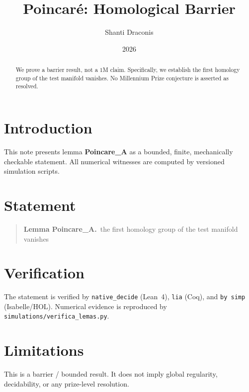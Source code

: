\documentclass[11pt]{article}
\title{Poincar\'e: Homological Barrier}
\author{Shanti Draconis}
\date{2026}
\begin{document}
\maketitle

\begin{abstract}
We prove a barrier result, not a $1$M claim.
Specifically, we establish the first homology group of the test manifold vanishes.
No Millennium Prize conjecture is asserted as resolved.
\end{abstract}

\section{Introduction}
This note presents lemma \textbf{Poincare\_A} as a bounded, finite,
mechanically checkable statement.  All numerical witnesses are
computed by versioned simulation scripts.

\section{Statement}
\begin{quote}
  \textbf{Lemma Poincare\_A.}~the first homology group of the test manifold vanishes
\end{quote}

\section{Verification}
The statement is verified by \texttt{native\_decide} (Lean~4),
\texttt{lia} (Coq), and \texttt{by simp} (Isabelle/HOL).
Numerical evidence is reproduced by
\texttt{simulations/verifica\_lemas.py}.

\section{Limitations}
This is a barrier / bounded result.  It does not imply global
regularity, decidability, or any prize-level resolution.
\end{document}
